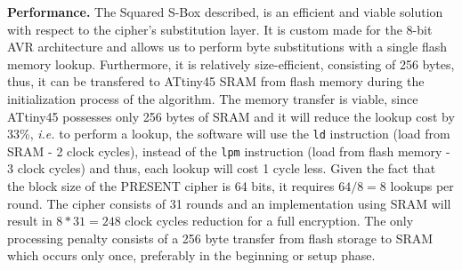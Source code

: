 \documentclass[11pt]{article}
\begin{document}
\textbf{Performance.} The Squared S-Box described, is an efficient and viable solution with respect to the cipher's substitution layer. It is custom made for the 8-bit AVR architecture and allows us to perform byte substitutions with a single flash memory lookup. Furthermore, it is relatively size-efficient, consisting of 256 bytes, thus, it can be transfered to ATtiny45 SRAM from flash memory during the initialization process of the algorithm. The memory transfer is viable, since ATtiny45 possesses only 256 bytes of SRAM and it will reduce the lookup cost by 33\%, \emph{i.e.} to perform a lookup, the software will use the \texttt{ld} instruction (load from SRAM - 2 clock cycles), instead of  the \texttt{lpm} instruction (load from flash memory - 3 clock cycles) and thus, each lookup will cost 1 cycle less. Given the fact that the block size of the PRESENT cipher is 64 bits, it requires $64/8=8$ lookups per round. The cipher consists of 31 rounds and an implementation using SRAM will result in $8*31=248$ clock cycles reduction for a full encryption. The only processing penalty consists of a 256 byte transfer from flash storage to SRAM which occurs only once, preferably in the beginning or setup phase.
\end{document}
